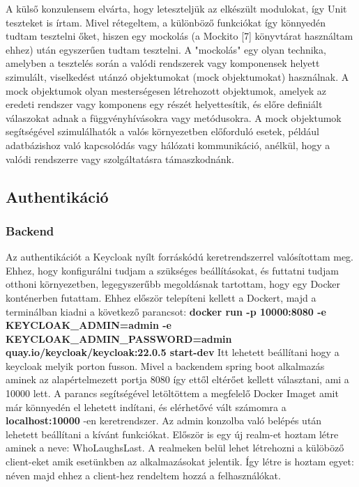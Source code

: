 \documentclass[a4paper,twoside]{article}
\begin{document}
A külső konzulensem elvárta, hogy leteszteljük az elkészült modulokat, így Unit teszteket is
írtam. Mivel rétegeltem, a különböző funkciókat így könnyedén tudtam tesztelni őket, hiszen
egy mockolás (a Mockito [7] könyvtárat használtam ehhez) után egyszerűen tudtam tesztelni.
A "mockolás" egy olyan technika, amelyben a tesztelés során a valódi rendszerek vagy
komponensek helyett szimulált, viselkedést utánzó objektumokat (mock objektumokat) használnak.
A mock objektumok olyan mesterségesen létrehozott objektumok, amelyek az
eredeti rendszer vagy komponens egy részét helyettesítik, és előre definiált válaszokat adnak a
függvényhívásokra vagy metódusokra. A mock objektumok segítségével szimulálhatók a
valós környezetben előforduló esetek, például adatbázishoz való kapcsolódás vagy hálózati
kommunikáció, anélkül, hogy a valódi rendszerre vagy szolgáltatásra támaszkodnánk. 
\subsection{Authentikáció}
\subsubsection{Backend}
Az authentikációt a Keycloak nyílt forráskódú keretrendszerrel valósítottam meg. Ehhez, hogy konfigurálni tudjam a 
szükséges beállításokat, és futtatni tudjam otthoni környezetben, legegyszerűbb megoldásnak tartottam, hogy egy Docker konténerben 
futattam. Ehhez először telepíteni kellett a Dockert, majd a terminálban kiadni a következő parancsot: 
\textbf{docker run -p 10000:8080 -e KEYCLOAK\_ADMIN=admin -e KEYCLOAK\_ADMIN\_PASSWORD=admin quay.io/keycloak/keycloak:22.0.5 start-dev}
Itt lehetett beállítani hogy a keycloak melyik porton fusson. Mivel a backendem spring boot alkalmazás aminek az alapértelmezett portja 8080 így 
ettől eltérőet kellett választani, ami a 10000 lett. A parancs segítségével letöltöttem a megfelelő Docker Imaget amit már könnyedén el lehetett indítani,
és elérhetővé vált számomra a \textbf{localhost:10000} -en keretrendszer. Az admin konzolba való belépés után lehetett beállítani a kívánt funkciókat. 
Először is egy új realm-et hoztam létre aminek a neve: WhoLaughsLast. A realmeken belül lehet létrehozni a külöböző client-eket amik esetünkben az alkalmazásokat jelentik. Így létre is hoztam egyet:  néven majd ehhez a client-hez rendeltem hozzá a felhasználókat. 
\end{document}
